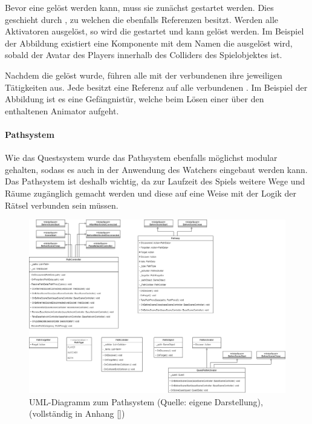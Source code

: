 Bevor eine  gelöst werden kann, muss sie zunächst gestartet werden. Dies geschieht durch , zu welchen die  ebenfalls Referenzen besitzt. Werden alle Aktivatoren ausgelöst, so wird die  gestartet und kann gelöst werden. Im Beispiel der Abbildung existiert eine Komponente mit dem Namen  die ausgelöst wird, sobald der Avatar des Players innerhalb des Colliders des Spielobjektes ist.

Nachdem die  gelöst wurde, führen alle mit der  verbundenen  ihre jeweiligen Tätigkeiten aus. Jede  besitzt eine Referenz auf alle verbundenen . Im Beispiel der Abbildung ist es eine Gefängnistür, welche beim Lösen einer  über den enthaltenen Animator aufgeht.

\paragraph{Pathsystem}\label{sec:path-system}
Wie das Questsystem wurde das Pathsystem ebenfalls möglichst modular gehalten, sodass es auch in der Anwendung des Watchers eingebaut werden kann. Das Pathsystem ist deshalb wichtig, da zur Laufzeit des Spiels weitere Wege und Räume zugänglich gemacht werden und diese auf eine Weise mit der Logik der Rätsel verbunden sein müssen.

\begin{figure}[ht]
\centering
\includegraphics[width=1\linewidth]{content/pictures/PathSystem.drawio.png}
\caption{UML-Diagramm zum Pathsystem (Quelle: eigene Darstellung), (vollständig in Anhang \ref{})}
\label{fig:path-system-uml}
\end{figure}

